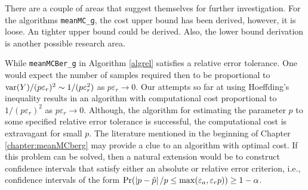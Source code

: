 \documentclass{iitthesis}
\theoremstyle{definition}
\begin{document}
There are a couple of areas that suggest themselves for further investigation. For the algorithms {\tt meanMC\_g}, the cost upper bound has been derived, however, it is loose. An tighter upper bound could be derived. Also, the lower bound derivation is another possible research area. 

While {\tt meanMCBer\_g} in Algorithm \ref{algrel} satisfies a relative error tolerance. One would expect the number of samples required then to be proportional to $\operatorname{var}(Y)/(p \varepsilon_r)^2 \sim 1/(p \varepsilon_r^2)$ as $p\varepsilon_r \to 0$.  Our attempts so far at using Hoeffding's inequality results in an algorithm with computational cost proportional to $1/(p \varepsilon_r)^2$ as $p\varepsilon_r \to 0$.  Although, the algorithm for estimating the parameter $p$ to some specified relative error tolerance is successful, the computational cost is extravagant for small $p$. The literature mentioned in the beginning of Chapter \ref{chapter:meanMCberg} may provide a clue to an algorithm with optimal cost.  If this problem can be solved, then a natural extension would be to construct confidence intervals that satisfy either an absolute or relative error criterion, i.e., confidence intervals of the form $\Pr(\left \lvert p-\hat{p} \right \rvert/p\leq \max(\varepsilon_a, \varepsilon_r p)) \geq 1-\alpha$.
%
%
%
%
%
\end{document}

